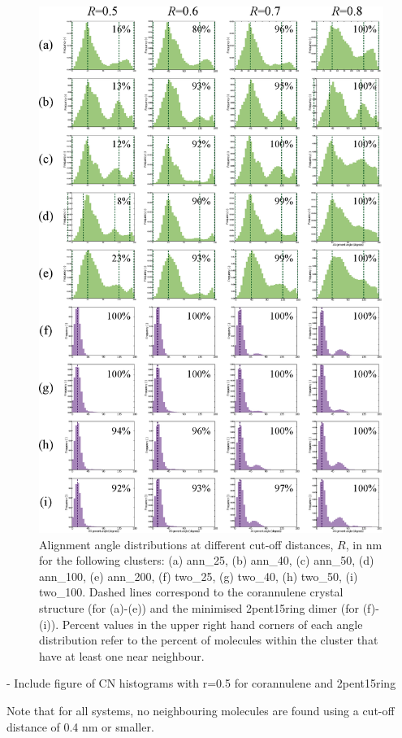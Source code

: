 \begin{figure}[!tbh]
\centering
\includegraphics[width=0.85\linewidth]{Figures/AlignmentAnglesCutoffAssessment_SI.eps}
\caption{Alignment angle distributions at different cut-off distances, $R$, in nm for the following clusters: (a) ann\_25, (b) ann\_40, (c) ann\_50, (d) ann\_100, (e) ann\_200, (f) two\_25, (g) two\_40, (h) two\_50, (i) two\_100. Dashed lines correspond to the corannulene crystal structure (for (a)-(e)) and the minimised 2pent15ring dimer (for (f)-(i)). Percent values in the upper right hand corners of each angle distribution refer to the percent of molecules within the cluster that have at least one near neighbour.}
\label{figSI:alignmentangles_cutoffs}
\end{figure}
%

- Include figure of CN histograms with r=0.5 for corannulene and 2pent15ring

Note that for all systems, no neighbouring molecules are found using a cut-off distance of 0.4 nm or smaller.


